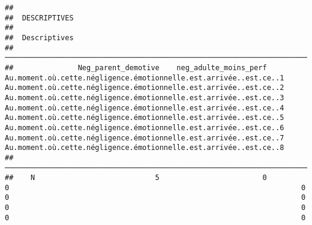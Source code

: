 \documentclass[
]{article}
\begin{document}
\begin{verbatim}
## 
##  DESCRIPTIVES
## 
##  Descriptives                                                                                                                                                                                                                                                                                                                                                                                                                                                                                                                                                                                                                        
##  ─────────────────────────────────────────────────────────────────────────────────────────────────────────────────────────────────────────────────────────────────────────────────────────────────────────────────────────────────────────────────────────────────────────────────────────────────────────────────────────────────────────────────────────────────────────────────────────────────────────────────────────────────────────────────────────────────────────────────────────────────────────────────────────────────────────────────────────────────────────────────────────────────────────────────────────────────── 
##               Neg_parent_demotive    neg_adulte_moins_perf    Au.moment.où.cette.négligence.émotionnelle.est.arrivée..est.ce..1    Au.moment.où.cette.négligence.émotionnelle.est.arrivée..est.ce..2    Au.moment.où.cette.négligence.émotionnelle.est.arrivée..est.ce..3    Au.moment.où.cette.négligence.émotionnelle.est.arrivée..est.ce..4    Au.moment.où.cette.négligence.émotionnelle.est.arrivée..est.ce..5    Au.moment.où.cette.négligence.émotionnelle.est.arrivée..est.ce..6    Au.moment.où.cette.négligence.émotionnelle.est.arrivée..est.ce..7    Au.moment.où.cette.négligence.émotionnelle.est.arrivée..est.ce..8   
##  ─────────────────────────────────────────────────────────────────────────────────────────────────────────────────────────────────────────────────────────────────────────────────────────────────────────────────────────────────────────────────────────────────────────────────────────────────────────────────────────────────────────────────────────────────────────────────────────────────────────────────────────────────────────────────────────────────────────────────────────────────────────────────────────────────────────────────────────────────────────────────────────────────────────────────────────────────── 
##    N                            5                        0                                                                    0                                                                    0                                                                    0                                                                    0                                                                    0                                                                    0                                                                    0                                                                    0   

\end{verbatim}
\end{document}
